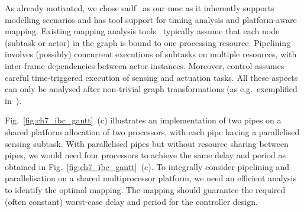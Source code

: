 As already motivated, we chose \gls{sadf}~\cite{theelen2006scenario} as our \gls{moc} as it inherently supports modelling scenarios and has tool support for timing analysis and platform-aware mapping.
Existing mapping analysis tools~\cite{stuijk2006sdf,anssi2012chronval} typically assume that each node (subtask or actor) in the graph is bound to one processing resource. Pipelining involves (possibly) concurrent executions of subtasks on multiple resources, with inter-frame dependencies between actor instances. Moreover, control assumes careful time-triggered execution of sensing and actuation tasks. All these aspects can only be analysed after non-trivial graph transformations (as e.g.\ exemplified in~\cite{lattuada2013modeling}).

Fig.~\ref{fig:ch7_ibc_gantt}~(c) illustrates an implementation of two pipes on a shared platform allocation of two processors, with each pipe having a parallelised sensing subtask. 
With parallelised pipes but without resource sharing between pipes, we would need four processors to achieve the same delay and period as obtained in Fig.~\ref{fig:ch7_ibc_gantt}~(c).
To integrally consider pipelining and parallelisation on a shared multiprocessor platform, we need an efficient analysis to identify the optimal mapping. The mapping should guarantee the required (often constant) worst-case delay and period for the controller design. 

\vspace{1mm}

